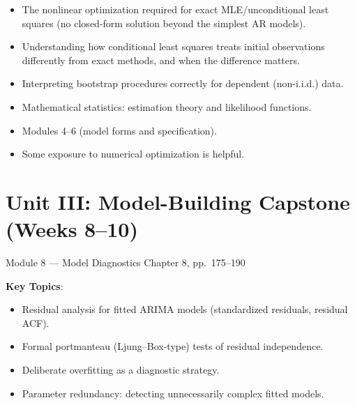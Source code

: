 \documentclass[11pt]{article}
\newcommand{\keytopics}{\textbf{\color{modblue}Key Topics}}
\begin{document}
\begin{difficult}
\begin{itemize}
  \item The nonlinear optimization required for exact MLE/unconditional least squares (no closed-form solution beyond the simplest AR models).
  \item Understanding how conditional least squares treats initial observations differently from exact methods, and when the difference matters.
  \item Interpreting bootstrap procedures correctly for dependent (non-i.i.d.) data.
\end{itemize}
\end{difficult}

\begin{prereqs}
\begin{itemize}
  \item Mathematical statistics: estimation theory and likelihood functions.
  \item Modules 4--6 (model forms and specification).
  \item Some exposure to numerical optimization is helpful.
\end{itemize}
\end{prereqs}

\newpage
\section{Unit III: Model-Building Capstone (Weeks 8--10)}

\begin{moduletitle}{Module 8 --- Model Diagnostics}
\small Chapter 8, pp.\ 175--190
\end{moduletitle}

\keytopics:
\begin{itemize}
  \item Residual analysis for fitted ARIMA models (standardized residuals, residual ACF).
  \item Formal portmanteau (Ljung--Box-type) tests of residual independence.
  \item Deliberate overfitting as a diagnostic strategy.
  \item Parameter redundancy: detecting unnecessarily complex fitted models.
\end{itemize}
\end{document}
